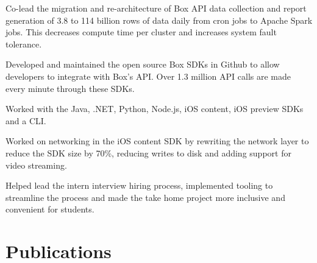 \documentclass[]{plushcv}
\begin{document}
\begin{minipage}[t]{0.74\textwidth}
\sectionsep

\begin{tightemize}
\sectionsep
\item Co-lead the migration and re-architecture of Box API data collection and report generation of 3.8 to 114 billion rows of data daily from cron jobs to Apache Spark jobs. This decreases compute time per cluster and increases system fault tolerance.
\item Developed and maintained the open source Box SDKs in Github to allow developers to integrate with Box's API. Over 1.3 million API calls are made every minute through these SDKs.
\item Worked with the Java, .NET, Python, Node.js, iOS content, iOS preview SDKs and a CLI.
\item Worked on networking in the iOS content SDK by rewriting the network layer to reduce the SDK size by 70\%, reducing writes to disk and adding support for video streaming.
\item Helped lead the intern interview hiring process, implemented tooling to streamline the process and made the take home project more inclusive and convenient for students.
\end{tightemize}

\section{Publications}
\\
\sectionsep
{}
\\


\end{minipage}
\end{document}
